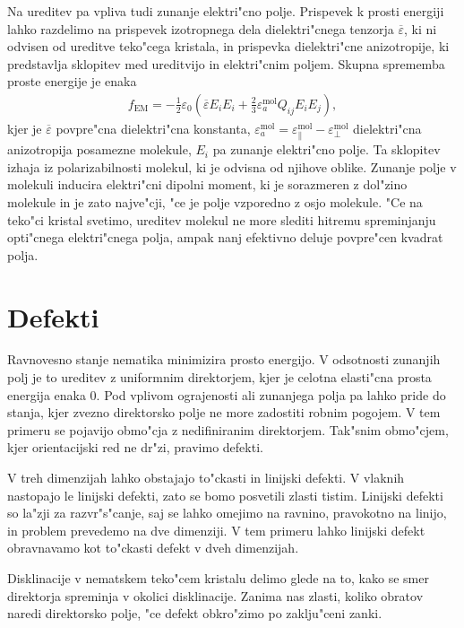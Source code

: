 \documentclass[12pt,twoside,openright,final]{report}
\begin{document}
Na ureditev pa vpliva tudi zunanje elektri"cno polje. 
Prispevek k prosti energiji lahko razdelimo na prispevek izotropnega dela dielektri"cnega tenzorja $\overline\varepsilon$, ki ni odvisen od ureditve teko"cega kristala, in prispevka dielektri"cne anizotropije, ki predstavlja sklopitev med ureditvijo in elektri"cnim poljem. 
Skupna sprememba proste energije je enaka
\begin{align}
\label{eq:dielektricna-sklopitev}
  f_{\mathrm{EM}} = -\frac{1}{2}\varepsilon_0 \left(\overline\varepsilon E_i E_i + \frac{2}{3}\varepsilon_a^{\mathrm{mol}} Q_{ij}E_iE_j \right),
\end{align}
kjer je $\overline{\varepsilon}$ povpre"cna dielektri"cna konstanta, $\varepsilon_a^{\mathrm{mol}} = \varepsilon_{\parallel}^{\mathrm{mol}} - \varepsilon_{\perp}^{\mathrm{mol}}$ dielektri"cna anizotropija posamezne molekule, $E_i$ pa zunanje elektri"cno polje. 
Ta sklopitev izhaja iz polarizabilnosti molekul, ki je odvisna od njihove oblike. 
Zunanje polje v molekuli inducira elektri"cni dipolni moment, ki je sorazmeren z dol"zino molekule in je zato najve"cji, "ce je polje vzporedno z osjo molekule. 
"Ce na teko"ci kristal svetimo, ureditev molekul ne more slediti hitremu spreminjanju opti"cnega elektri"cnega polja, ampak nanj efektivno deluje povpre"cen kvadrat polja. 

\section{Defekti}

Ravnovesno stanje nematika minimizira prosto energijo. 
V odsotnosti zunanjih polj je to ureditev z uniformnim direktorjem, kjer je celotna elasti"cna prosta energija enaka 0\cite{mermin}. 
Pod vplivom ograjenosti ali zunanjega polja pa lahko pride do stanja, kjer zvezno direktorsko polje ne more zadostiti robnim pogojem. 
V tem primeru se pojavijo obmo"cja z nedifiniranim direktorjem. 
Tak"snim obmo"cjem, kjer orientacijski red ne dr"zi, pravimo defekti. 

V treh dimenzijah lahko obstajajo to"ckasti in linijski defekti\cite{degennes,kleman}. 
V vlaknih nastopajo le linijski defekti, zato se bomo posvetili zlasti tistim. 
Linijski defekti so la"zji za razvr"s"canje, saj se lahko omejimo na ravnino, pravokotno na linijo, in problem prevedemo na dve dimenziji. 
V tem primeru lahko linijski defekt obravnavamo kot to"ckasti defekt v dveh dimenzijah. 

Disklinacije v nematskem teko"cem kristalu delimo glede na to, kako se smer direktorja spreminja v okolici disklinacije. 
Zanima nas zlasti, koliko obratov naredi direktorsko polje, "ce defekt obkro"zimo po zaklju"ceni zanki. 
\end{document}

